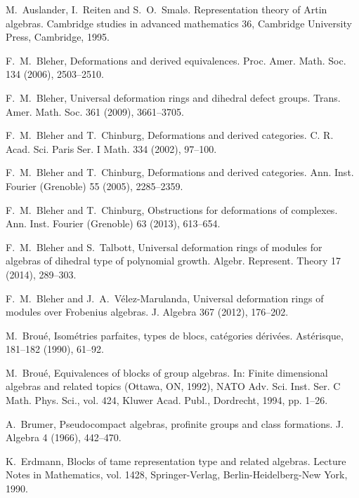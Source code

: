 \documentclass{amsart}
\theoremstyle{plain}
\theoremstyle{definition}
\theoremstyle{remark}
\begin{document}
\begin{thebibliography}{88}

 M.~Auslander, I.~Reiten and S.~O.~Smal\/{\o}. Representation theory of Artin
algebras. Cambridge studies in advanced mathematics 36, Cambridge University Press, Cambridge, 1995.

 F.~M.~Bleher, Deformations and derived equivalences. 
Proc. Amer. Math. Soc. 134 (2006), 2503--2510. 

 F.~M.~Bleher, Universal deformation rings and dihedral defect groups.
	Trans. Amer. Math. Soc. 361 (2009), 3661--3705.

 F.~M.~Bleher and T.~Chinburg, Deformations
                and derived categories. C. R. Acad. Sci. Paris Ser. I Math.
        334 (2002), 97--100.

 F.~M.~Bleher and T.~Chinburg, Deformations
                and derived categories. Ann. Inst. Fourier (Grenoble) 55 (2005), 2285--2359.
                
 F.~M.~Bleher and T.~Chinburg, Obstructions for
deformations of complexes. Ann. Inst. Fourier (Grenoble) 63 (2013), 613--654. 
	     
 F.~M.~Bleher and S.~Talbott, Universal deformation rings of modules for algebras of dihedral type of 
	polynomial growth. Algebr. Represent. Theory 17 (2014), 289--303.
	
 F.~M.~Bleher and J.~A.~V\'{e}lez-Marulanda,  
	Universal deformation rings of modules over Frobenius algebras.  J. Algebra 367 (2012), 176--202.
	
 M.~Brou\'{e}, Isom\'{e}tries parfaites, types de blocs, cat\'{e}gories d\'{e}riv\'{e}es.
Ast\'{e}risque, 181--182 (1990), 61--92.

 M.~Brou\'{e}, Equivalences of blocks of group algebras. In: Finite dimensional algebras and related topics (Ottawa, ON, 1992), NATO Adv. Sci. Inst. Ser. C Math. Phys. Sci., vol. 424, Kluwer Acad. Publ., Dordrecht, 1994, pp. 1--26.
                        
 A.~Brumer, Pseudocompact algebras, profinite groups and class formations.
	J. Algebra 4 (1966), 442--470.

 K.~Erdmann, Blocks of tame representation type and related algebras. 
Lecture Notes in Mathematics, vol. 1428, Springer-Verlag, Berlin-Heidelberg-New York, 1990.


\end{thebibliography}
\end{document}
